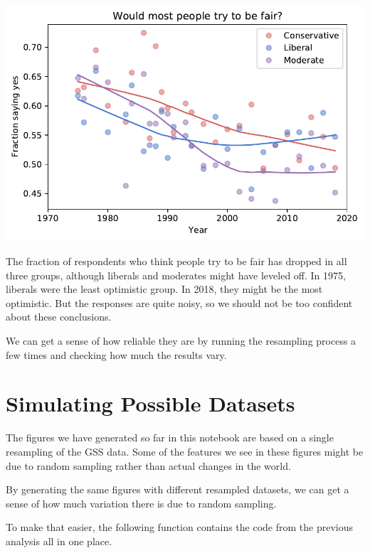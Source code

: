\begin{center}
\includegraphics[scale=0.75]{03_outlook_files/03_outlook_55_0.pdf}
\end{center}

The fraction of respondents who think people try to be fair has dropped
in all three groups, although liberals and moderates might have leveled
off. In 1975, liberals were the least optimistic group. In 2018, they
might be the most optimistic. But the responses are quite noisy, so we
should not be too confident about these conclusions.

We can get a sense of how reliable they are by running the resampling
process a few times and checking how much the results vary.

\hypertarget{simulating-possible-datasets}{%
\section{Simulating Possible
Datasets}\label{simulating-possible-datasets}}

The figures we have generated so far in this notebook are based on a
single resampling of the GSS data. Some of the features we see in these
figures might be due to random sampling rather than actual changes in
the world.

By generating the same figures with different resampled datasets, we can
get a sense of how much variation there is due to random sampling.

To make that easier, the following function contains the code from the
previous analysis all in one place.

